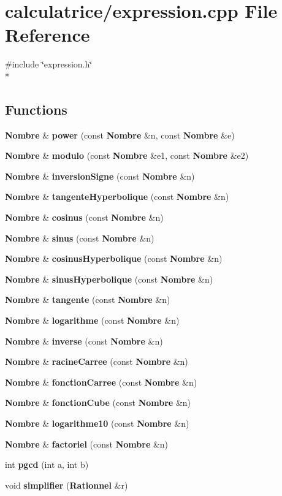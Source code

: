 \section{calculatrice/expression.cpp File Reference}
\label{expression_8cpp}
{\ttfamily \#include \char`\"{}expression.\-h\char`\"{}}\\*
\subsection*{Functions}
\begin{DoxyCompactItemize}
\item 
{\bf Nombre} \& {\bf power} (const {\bf Nombre} \&n, const {\bf Nombre} \&e)
\item 
{\bf Nombre} \& {\bf modulo} (const {\bf Nombre} \&e1, const {\bf Nombre} \&e2)
\item 
{\bf Nombre} \& {\bf inversion\-Signe} (const {\bf Nombre} \&n)
\item 
{\bf Nombre} \& {\bf tangente\-Hyperbolique} (const {\bf Nombre} \&n)
\item 
{\bf Nombre} \& {\bf cosinus} (const {\bf Nombre} \&n)
\item 
{\bf Nombre} \& {\bf sinus} (const {\bf Nombre} \&n)
\item 
{\bf Nombre} \& {\bf cosinus\-Hyperbolique} (const {\bf Nombre} \&n)
\item 
{\bf Nombre} \& {\bf sinus\-Hyperbolique} (const {\bf Nombre} \&n)
\item 
{\bf Nombre} \& {\bf tangente} (const {\bf Nombre} \&n)
\item 
{\bf Nombre} \& {\bf logarithme} (const {\bf Nombre} \&n)
\item 
{\bf Nombre} \& {\bf inverse} (const {\bf Nombre} \&n)
\item 
{\bf Nombre} \& {\bf racine\-Carree} (const {\bf Nombre} \&n)
\item 
{\bf Nombre} \& {\bf fonction\-Carree} (const {\bf Nombre} \&n)
\item 
{\bf Nombre} \& {\bf fonction\-Cube} (const {\bf Nombre} \&n)
\item 
{\bf Nombre} \& {\bf logarithme10} (const {\bf Nombre} \&n)
\item 
{\bf Nombre} \& {\bf factoriel} (const {\bf Nombre} \&n)
\item 
int {\bf pgcd} (int a, int b)
\item 
void {\bf simplifier} ({\bf Rationnel} \&r)
\end{DoxyCompactItemize}


